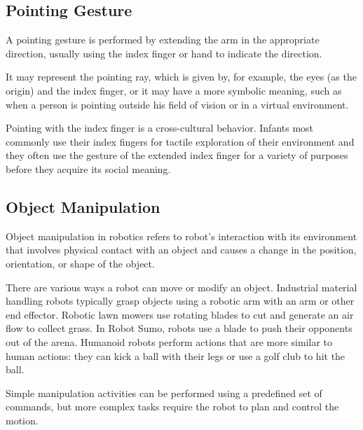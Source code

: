 \subsection{Pointing Gesture}
A pointing gesture is performed by extending the arm in the appropriate
direction, usually using the index finger or hand to indicate the direction.\par
It may represent the pointing ray, which is given by, for example,
the eyes (as the origin) and the index finger, or it may have a more symbolic
meaning, such as when a person is pointing outside his field of vision or in a virtual environment.\par
Pointing with the index finger is a cross-cultural behavior. Infants most commonly use their index fingers for tactile exploration of their environment and they often use the gesture of the extended
index finger for a variety of purposes before they acquire its social meaning.\par

\subsection{Object Manipulation}
Object manipulation in robotics refers to robot's interaction with its environment that involves physical contact with an object and causes a change in the position, orientation, or shape of the object.\par
There are various ways a robot can move or modify an object. Industrial material handling robots typically grasp objects using a robotic arm with an arm or other end effector. Robotic lawn mowers use rotating blades to cut and generate an air flow to collect grass. In Robot Sumo, robots use a blade to push their opponents out of the arena. Humanoid robots perform actions that are more similar to human actions: they can kick a ball with their legs or use a golf club to hit the ball.\par

Simple manipulation activities can be performed using a predefined set of commands, but more complex tasks require the robot to plan and control the motion.\par


